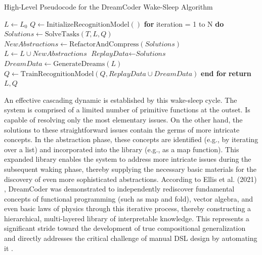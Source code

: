 \documentclass[12pt, a4paper]{report}
\begin{document}
\begin{algorithm}
\caption{High-Level Pseudocode for the DreamCoder Wake-Sleep Algorithm}
\label{alg:dreamcoder}
\begin{algorithmic}[1]
\STATE $L \leftarrow L_{0}$ 
\STATE $Q \leftarrow \text{InitializeRecognitionModel}()$
\STATE \textbf{for} iteration = 1 to N \textbf{do}
\STATE \quad {}
\STATE \quad $\textit{Solutions} \leftarrow \text{SolveTasks}(T, L, Q)$
\STATE
\STATE \quad {}
\STATE \quad $\textit{NewAbstractions} \leftarrow \text{RefactorAndCompress}(\textit{Solutions})$
\STATE \quad $L \leftarrow L \cup \textit{NewAbstractions}$
\STATE
\STATE \quad {}
\STATE \quad $\textit{ReplayData} \leftarrow \textit{Solutions}$
\STATE \quad $\textit{DreamData} \leftarrow \text{GenerateDreams}(L)$
\STATE \quad $Q \leftarrow \text{TrainRecognitionModel}(Q, \textit{ReplayData} \cup \textit{DreamData})$
\STATE \textbf{end for}
\STATE \textbf{return} $L, Q$
\end{algorithmic}
\end{algorithm}

An effective cascading dynamic is established by this wake-sleep cycle. The system is comprised of a limited number of primitive functions at the outset. Is capable of resolving only the most elementary issues. On the other hand, the solutions to these straightforward issues contain the germs of more intricate concepts. In the abstraction phase, these concepts are identified (e.g., by iterating over a list) and incorporated into the library (e.g., as a map function). This expanded library enables the system to address more intricate issues during the subsequent waking phase, thereby supplying the necessary basic materials for the discovery of even more sophisticated abstractions. According to Ellis et al. (2021) \citep{ellis2021dreamcoder}, DreamCoder was demonstrated to independently rediscover fundamental concepts of functional programming (such as map and fold), vector algebra, and even basic laws of physics through this iterative process, thereby constructing a hierarchical, multi-layered library of interpretable knowledge. This represents a significant stride toward the development of true compositional generalization and directly addresses the critical challenge of manual DSL design by automating it \citep{ellis2021dreamcoder}.
\end{document}
